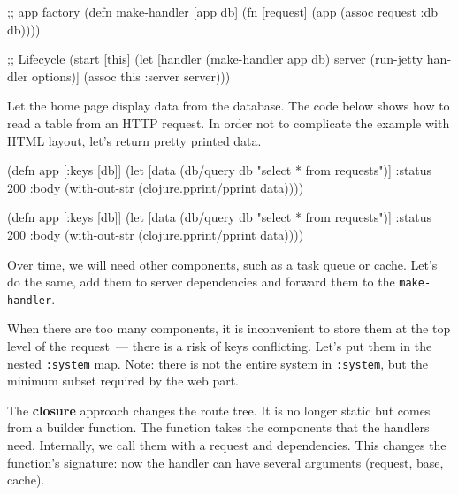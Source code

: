 \begin{english}
  \begin{clojure}
;; app factory
(defn make-handler [app db]
  (fn [request]
    (app (assoc request :db db))))

;; Lifecycle
(start [this]
  (let [handler (make-handler app db)
        server (run-jetty handler options)]
    (assoc this :server server)))
  \end{clojure}
\end{english}

\fi

Let the home page display data from the database. The code below shows how to read a table from an HTTP request. In order not to complicate the example with HTML layout, let's return pretty printed data.

\ifnarrow

\begin{english}
  \begin{clojure}
(defn app [{:keys [db]}]
  (let [data (db/query db
               "select * from requests")]
    {:status 200
     :body (with-out-str
             (clojure.pprint/pprint
               data))}))
  \end{clojure}
\end{english}

\else

\begin{english}
  \begin{clojure}
(defn app [{:keys [db]}]
  (let [data (db/query db "select * from requests")]
    {:status 200
     :body (with-out-str
             (clojure.pprint/pprint data))}))
  \end{clojure}
\end{english}

\fi

Over time, we will need other components, such as a task queue or cache. Let's do the same, add them to server dependencies and forward them to the \verb|make-handler|.


When there are too many components, it is inconvenient to store them at the top level of the request~--- there is a risk of keys conflicting. Let's put them in the nested \verb|:system| map. Note: there is not the entire system in \verb|:system|, but the minimum subset required by the web part.


The \textbf{closure} approach changes the route tree. It is no longer static but comes from a builder function. The function takes the components that the handlers need. Internally, we call them with a request and dependencies. This changes the function's signature: now the handler can have several arguments (request, base, cache).

